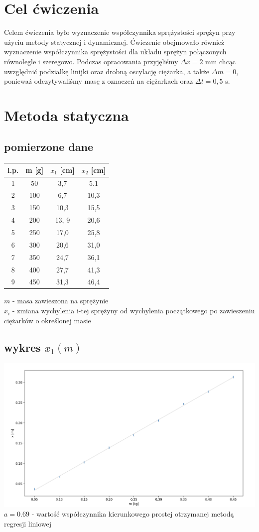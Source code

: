 \documentclass{article}
\begin{document}
\section{Cel ćwiczenia}
Celem ćwiczenia było wyznaczenie współczynnika sprężystości sprężyn przy użyciu metody statycznej i dynamicznej.  Ćwiczenie obejmowało również wyznaczenie współczynnika sprężystości dla układu sprężyn połączonych równolegle i szeregowo. Podczas opracowania przyjęliśmy $\Delta x = 2$ mm chcąc uwzględnić podziałkę linijki oraz drobną oscylację ciężarka, a także $\Delta m = 0$, 
ponieważ odczytywaliśmy masę z oznaczeń na ciężarkach oraz $\Delta t = 0,5 $ s.

\section{Metoda statyczna}
\subsection{pomierzone dane}
\begin{center}
\begin{tabular}{ c | c | c | c}
l.p. & m [g] & $x_1$ [cm] & $x_2$ [cm]\\
\hline
 1    & 50 & 3,7 & 5.1\\ 
 2    & 100 & 6,7 & 10,3\\ 
 3  & 150 & 10,3 & 15,5\\ 
 4  & 200 & 13, 9 & 20,6\\
 5   & 250 & 17,0 &25,8\\
 6  & 300 & 20,6 & 31,0\\
 7  & 350 & 24,7 & 36,1\\
 8  & 400 & 27,7 & 41,3\\
 9  & 450 & 31,3 & 46,4

\end{tabular}
\end{center}
$m$ - masa zawieszona na sprężynie \\
$x_i$ - zmiana wychylenia i-tej sprężyny od wychylenia początkowego po zawieszeniu ciężarków o określonej masie

\subsection{wykres $x_1(m)$}
\includegraphics[width=15cm]{m7_1}\\
 $a = 0.69$  - wartość współczynnika kierunkowego prostej otrzymanej metodą regresji liniowej
\end{document}
